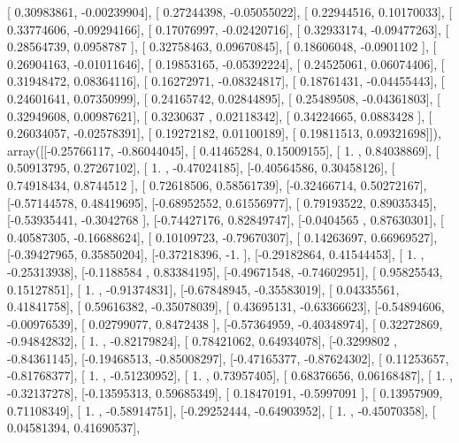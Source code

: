 \documentclass{article}
\begin{document}
       [ 0.30983861, -0.00239904],
       [ 0.27244398, -0.05055022],
       [ 0.22944516,  0.10170033],
       [ 0.33774606, -0.09294166],
       [ 0.17076997, -0.02420716],
       [ 0.32933174, -0.09477263],
       [ 0.28564739,  0.0958787 ],
       [ 0.32758463,  0.09670845],
       [ 0.18606048, -0.0901102 ],
       [ 0.26904163, -0.01011646],
       [ 0.19853165, -0.05392224],
       [ 0.24525061,  0.06074406],
       [ 0.31948472,  0.08364116],
       [ 0.16272971, -0.08324817],
       [ 0.18761431, -0.04455443],
       [ 0.24601641,  0.07350999],
       [ 0.24165742,  0.02844895],
       [ 0.25489508, -0.04361803],
       [ 0.32949608,  0.00987621],
       [ 0.3230637 ,  0.02118342],
       [ 0.34224665,  0.0883428 ],
       [ 0.26034057, -0.02578391],
       [ 0.19272182,  0.01100189],
       [ 0.19811513,  0.09321698]]), array([[-0.25766117, -0.86044045],
       [ 0.41465284,  0.15009155],
       [ 1.        ,  0.84038869],
       [ 0.50913795,  0.27267102],
       [ 1.        , -0.47024185],
       [-0.40564586,  0.30458126],
       [ 0.74918434,  0.8744512 ],
       [ 0.72618506,  0.58561739],
       [-0.32466714,  0.50272167],
       [-0.57144578,  0.48419695],
       [-0.68952552,  0.61556977],
       [ 0.79193522,  0.89035345],
       [-0.53935441, -0.3042768 ],
       [-0.74427176,  0.82849747],
       [-0.0404565 ,  0.87630301],
       [ 0.40587305, -0.16688624],
       [ 0.10109723, -0.79670307],
       [ 0.14263697,  0.66969527],
       [-0.39427965,  0.35850204],
       [-0.37218396, -1.        ],
       [-0.29182864,  0.41544453],
       [ 1.        , -0.25313938],
       [-0.1188584 ,  0.83384195],
       [-0.49671548, -0.74602951],
       [ 0.95825543,  0.15127851],
       [ 1.        , -0.91374831],
       [-0.67848945, -0.35583019],
       [ 0.04335561,  0.41841758],
       [ 0.59616382, -0.35078039],
       [ 0.43695131, -0.63366623],
       [-0.54894606, -0.00976539],
       [ 0.02799077,  0.8472438 ],
       [-0.57364959, -0.40348974],
       [ 0.32272869, -0.94842832],
       [ 1.        , -0.82179824],
       [ 0.78421062,  0.64934078],
       [-0.3299802 , -0.84361145],
       [-0.19468513, -0.85008297],
       [-0.47165377, -0.87624302],
       [ 0.11253657, -0.81768377],
       [ 1.        , -0.51230952],
       [ 1.        ,  0.73957405],
       [ 0.68376656,  0.06168487],
       [ 1.        , -0.32137278],
       [-0.13595313,  0.59685349],
       [ 0.18470191, -0.5997091 ],
       [ 0.13957909,  0.71108349],
       [ 1.        , -0.58914751],
       [-0.29252444, -0.64903952],
       [ 1.        , -0.45070358],
       [ 0.04581394,  0.41690537],
\end{document}
